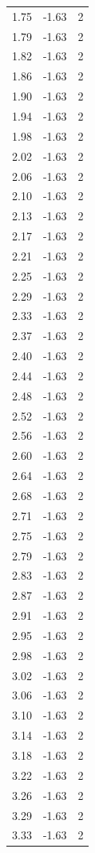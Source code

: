 \begin{longtable}{lrr}
  1.75 & -1.63 & 2 \\
  1.79 & -1.63 & 2 \\
  1.82 & -1.63 & 2 \\
  1.86 & -1.63 & 2 \\
  1.90 & -1.63 & 2 \\
  1.94 & -1.63 & 2 \\
  1.98 & -1.63 & 2 \\
  2.02 & -1.63 & 2 \\
  2.06 & -1.63 & 2 \\
  2.10 & -1.63 & 2 \\
  2.13 & -1.63 & 2 \\
  2.17 & -1.63 & 2 \\
  2.21 & -1.63 & 2 \\
  2.25 & -1.63 & 2 \\
  2.29 & -1.63 & 2 \\
  2.33 & -1.63 & 2 \\
  2.37 & -1.63 & 2 \\
  2.40 & -1.63 & 2 \\
  2.44 & -1.63 & 2 \\
  2.48 & -1.63 & 2 \\
  2.52 & -1.63 & 2 \\
  2.56 & -1.63 & 2 \\
  2.60 & -1.63 & 2 \\
  2.64 & -1.63 & 2 \\
  2.68 & -1.63 & 2 \\
  2.71 & -1.63 & 2 \\
  2.75 & -1.63 & 2 \\
  2.79 & -1.63 & 2 \\
  2.83 & -1.63 & 2 \\
  2.87 & -1.63 & 2 \\
  2.91 & -1.63 & 2 \\
  2.95 & -1.63 & 2 \\
  2.98 & -1.63 & 2 \\
  3.02 & -1.63 & 2 \\
  3.06 & -1.63 & 2 \\
  3.10 & -1.63 & 2 \\
  3.14 & -1.63 & 2 \\
  3.18 & -1.63 & 2 \\
  3.22 & -1.63 & 2 \\
  3.26 & -1.63 & 2 \\
  3.29 & -1.63 & 2 \\
  3.33 & -1.63 & 2 \\

\end{longtable}
